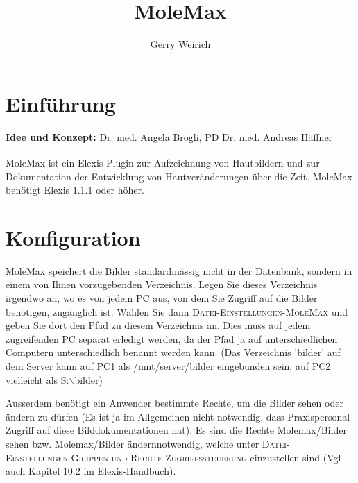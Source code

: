 \documentclass[a4paper]{scrartcl}
\begin{document}
\title{MoleMax}
\author{Gerry Weirich}
\maketitle

\section{Einführung}
\textbf{Idee und Konzept:} Dr. med. Angela Brögli, PD Dr. med. Andreas Häffner
\bigskip

MoleMax ist ein Elexis\textsuperscript{\textregistered}-Plugin zur Aufzeichnung von Hautbildern und zur Dokumentation der Entwicklung von Hautveränderungen über die Zeit.
MoleMax benötigt Elexis 1.1.1 oder höher.
\section{Konfiguration}
MoleMax speichert die Bilder standardmässig nicht in der Datenbank, sondern in einem von Ihnen vorzugebenden Verzeichnis. Legen Sie dieses Verzeichnis irgendwo an, wo es von jedem PC aus, von dem Sie Zugriff auf die Bilder benötigen, zugänglich ist. Wählen Sie dann \textsc{Datei-Einstellungen-MoleMax} und geben Sie dort den Pfad zu diesem Verzeichnis an. Dies muss auf jedem zugreifenden PC separat erledigt werden, da der Pfad ja auf unterschiedlichen Computern unterschiedlich benannt werden kann.
(Das Verzeichnis 'bilder' auf dem Server kann auf PC1 als /mnt/server/bilder eingebunden sein, auf PC2 vielleicht als S:$\backslash$bilder)

\bigskip

Ausserdem benötigt ein Anwender bestimmte Rechte, um die Bilder sehen oder ändern zu dürfen (Es ist ja im Allgemeinen nicht notwendig, dass Praxispersonal Zugriff auf diese Bilddokumentationen hat). Es sind die Rechte \glqq Molemax/Bilder sehen\grqq{} bzw. \glqq Molemax/Bilder ändern\grqq notwendig, welche unter \textsc{Datei-Einstellungen-Gruppen und Rechte-Zugriffssteuerung} einzustellen sind (Vgl auch Kapitel 10.2 im Elexis-Handbuch).
\end{document}
